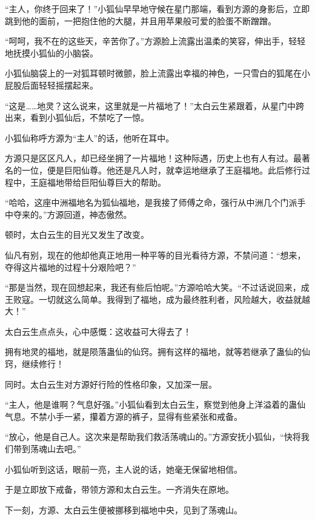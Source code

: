 
\begin{this_body}

“主人，你终于回来了！”小狐仙早早地守候在星门那端，看到方源的身影后，立即跳到他的面前，一把抱住他的大腿，并且用苹果般可爱的脸蛋不断蹭蹭。

“呵呵，我不在的这些天，辛苦你了。”方源脸上流露出温柔的笑容，伸出手，轻轻地抚摸小狐仙的小脑袋。

小狐仙脑袋上的一对狐耳顿时微颤，脸上流露出幸福的神色，一只雪白的狐尾在小屁股后面轻轻摇摆起来。

“这是……地灵？这么说来，这里就是一片福地了！”太白云生紧跟着，从星门中跨出来，看到小狐仙后，不禁吃了一惊。

小狐仙称呼方源为“主人”的话，他听在耳中。

方源只是区区凡人，却已经坐拥了一片福地！这种际遇，历史上也有人有过。最著名的一位，便是巨阳仙尊。他还是凡人时，就幸运地继承了王庭福地。此后修行过程中，王庭福地带给巨阳仙尊巨大的帮助。

“哈哈，这座中洲福地名为狐仙福地，是我接了师傅之命，强行从中洲几个门派手中夺来的。”方源回道，神态傲然。

顿时，太白云生的目光又发生了改变。

仙凡有别，现在的他却他真正地用一种平等的目光看待方源，不禁问道：“想来，夺得这片福地的过程十分艰险吧？”

“那是当然，现在回想起来，我还有些后怕呢。”方源哈哈大笑。“不过话说回来，成王败寇。一切就这么简单。我得到了福地，成为最终胜利者，风险越大，收益就越大！”

太白云生点点头，心中感慨：这收益可大得去了！

拥有地灵的福地，就是陨落蛊仙的仙窍。拥有这样的福地，就等若继承了蛊仙的仙窍，继续修行！

同时。太白云生对方源好行险的性格印象，又加深一层。

“主人，他是谁啊？气息好强。”小狐仙看到太白云生，察觉到他身上洋溢着的蛊仙气息。不禁小手一紧，攥着方源的裤子，显得有些紧张和戒备。

“放心，他是自己人。这次来是帮助我们救活荡魂山的。”方源安抚小狐仙，“快将我们带到荡魂山去吧。”

小狐仙听到这话，眼前一亮，主人说的话，她毫无保留地相信。

于是立即放下戒备，带领方源和太白云生。一齐消失在原地。

下一刻，方源、太白云生便被挪移到福地中央，见到了荡魂山。


\end{this_body}
